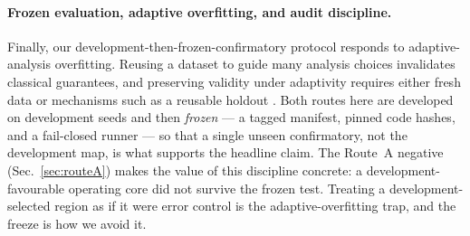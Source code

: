 \paragraph{Frozen evaluation, adaptive overfitting, and audit discipline.}
Finally, our development-then-frozen-confirmatory protocol responds to adaptive-analysis overfitting. Reusing a
dataset to guide many analysis choices invalidates classical guarantees, and preserving validity under
adaptivity requires either fresh data or mechanisms such as a reusable holdout \cite{dwork2015adaptive}. Both
routes here are developed on development seeds and then \emph{frozen} --- a tagged manifest, pinned code hashes,
and a fail-closed runner --- so that a single unseen confirmatory, not the development map, is what supports the
headline claim. The Route~A negative (Sec.~\ref{sec:routeA}) makes the value of this discipline concrete: a
development-favourable operating core did not survive the frozen test. Treating a development-selected region as
if it were error control is the adaptive-overfitting trap, and the freeze is how we avoid it.
